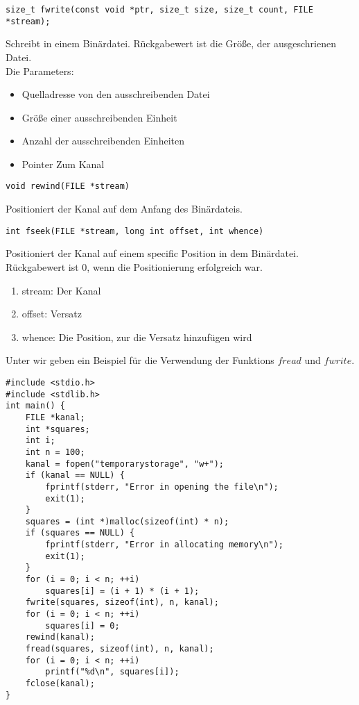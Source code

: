 \documentclass{article}[12pt]
\newenvironment{myexampleblock}[1]{%
    \tcolorbox[beamer,%
    noparskip,breakable,
    colback=White,colframe=ForestGreen,%
    colbacklower=LimeGreen!75!White,%
    title=#1]}%
    {\endtcolorbox}
\begin{document}
\begin{myexampleblock}{Funktion: \texttt{fwrite}}
\begin{lstlisting}
size_t fwrite(const void *ptr, size_t size, size_t count, FILE *stream);
\end{lstlisting}
\vspace{-0.4cm}
Schreibt in einem Binärdatei. Rückgabewert ist die Größe, der ausgeschrienen
Datei.\\ Die Parameters:
\begin{itemize}
\item Quelladresse von den ausschreibenden Datei 
\item Größe einer ausschreibenden Einheit
\item Anzahl der ausschreibenden Einheiten
\item Pointer Zum Kanal
\end{itemize}
\end{myexampleblock}
\begin{myexampleblock}{Funktion: \texttt{rewind}}
\begin{lstlisting}
void rewind(FILE *stream)
\end{lstlisting}
\vspace{-0.4cm}
Positioniert der Kanal auf dem Anfang des Binärdateis.
\end{myexampleblock}
\begin{myexampleblock}{Funktion: \texttt{fseek}}
\begin{lstlisting}
int fseek(FILE *stream, long int offset, int whence)
\end{lstlisting}
\vspace{-0.4cm}
Positioniert der Kanal auf einem specific Position in dem 
Binärdatei. Rückgabewert ist 0, wenn die Positionierung erfolgreich war.
\begin{enumerate}
\item stream: Der Kanal
\item offset: Versatz
\item whence: Die Position, zur die Versatz hinzufügen wird
\end{enumerate}
\end{myexampleblock}
Unter wir geben ein Beispiel für die Verwendung der Funktions $fread$ und $fwrite$.
\begin{lstlisting}
#include <stdio.h>
#include <stdlib.h>
int main() {
    FILE *kanal;
    int *squares;
    int i;
    int n = 100;
    kanal = fopen("temporarystorage", "w+");
    if (kanal == NULL) {
        fprintf(stderr, "Error in opening the file\n");
        exit(1);
    }
    squares = (int *)malloc(sizeof(int) * n);
    if (squares == NULL) {
        fprintf(stderr, "Error in allocating memory\n");
        exit(1);
    }
    for (i = 0; i < n; ++i)
        squares[i] = (i + 1) * (i + 1);
    fwrite(squares, sizeof(int), n, kanal);
    for (i = 0; i < n; ++i)
        squares[i] = 0;
    rewind(kanal);
    fread(squares, sizeof(int), n, kanal);
    for (i = 0; i < n; ++i)
        printf("%d\n", squares[i]);
    fclose(kanal);
}
\end{lstlisting}
\end{document}
